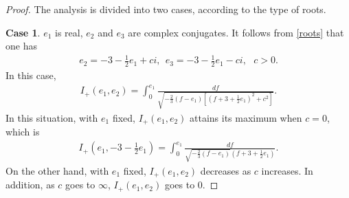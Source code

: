 \documentclass[reqno,12pt]{amsart}
\begin{document}
\begin{proof}
The analysis is divided into two cases, according to the type of roots. 

{\bf Case 1}. $e_1$ is real, $e_2$ and $e_3$ are complex conjugates. It follows from  \eqref{roots} that one has
\begin{align}\nonumber
e_2= -3 -\frac12 e_1 + ci, \ \ e_3 =-3-\frac12 e_1 - ci,\ \ \ c>0.
\end{align}
In this case, 
\begin{align*}
I_{+}(e_1, e_2) = \int_0^{e_1} \frac{df }{\sqrt{-\frac23 (f-e_1) \left[ (f+ 3 + \frac12 e_1)^2 + c^2 \right]}} .
\end{align*}
In this situation, with $e_1$ fixed, $I_+(e_1, e_2)$ attains its maximum when $c=0$, which is 
\begin{align*}
    I_{+}\left(e_1, -3 - \frac12 e_1\right)= \int_0^{e_1} \frac{df }{\sqrt{-\frac23 (f-e_1)} (f+3 +\frac12 e_1)}. 
\end{align*}
On the other hand, with $e_1$ fixed, $I_+(e_1,e_2)$ decreases as $c$ increases. In addition, as $c$ goes to $\infty$, $I_{+}(e_1, e_2)$ goes to 0. 


\end{proof}
\end{document}
